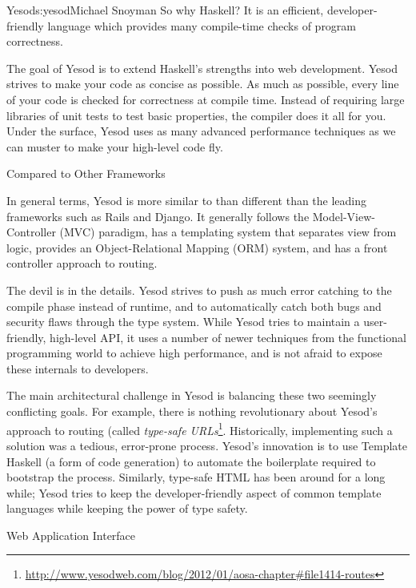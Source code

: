 \begin{aosachapter}{Yesod}{s:yesod}{Michael Snoyman}
So why Haskell? It is an efficient, developer-friendly language which
provides many compile-time checks of program correctness.

The goal of Yesod is to extend Haskell's strengths into web
development. Yesod strives to make your code as concise as
possible. As much as possible, every line of your code is checked for
correctness at compile time. Instead of requiring large libraries of
unit tests to test basic properties, the compiler does it all for
you. Under the surface, Yesod uses as many advanced performance
techniques as we can muster to make your high-level code fly.

\begin{aosasect1}{Compared to Other Frameworks}

In general terms, Yesod is more similar to than different than 
the leading frameworks such as Rails and Django. It generally
follows the Model-View-Controller (MVC) paradigm, has a templating
system that separates view from logic, provides an Object-Relational
Mapping (ORM) system, and has a front controller approach to routing.

The devil is in the details. Yesod strives to push as much error
catching to the compile phase instead of runtime, and to automatically
catch both bugs and security flaws through the type system. While
Yesod tries to maintain a user-friendly, high-level API, it uses a
number of newer techniques from the functional programming world to
achieve high performance, and is not afraid to expose these internals
to developers.

The main architectural challenge in Yesod is balancing these two
seemingly conflicting goals. For example, there is nothing
revolutionary about Yesod's approach to routing (called
\emph{type-safe URLs}\footnote{\url{http://www.yesodweb.com/blog/2012/01/aosa-chapter#file1414-routes}}.
Historically, implementing such a solution was a tedious, error-prone
process. Yesod's innovation is to use Template Haskell (a form of code
generation) to automate the boilerplate required to bootstrap the
process. Similarly, type-safe HTML has been around for a long while;
Yesod tries to keep the developer-friendly aspect of common template
languages while keeping the power of type safety.

\end{aosasect1}

\begin{aosasect1}{Web Application Interface}


\end{aosasect1}
\end{aosachapter}
